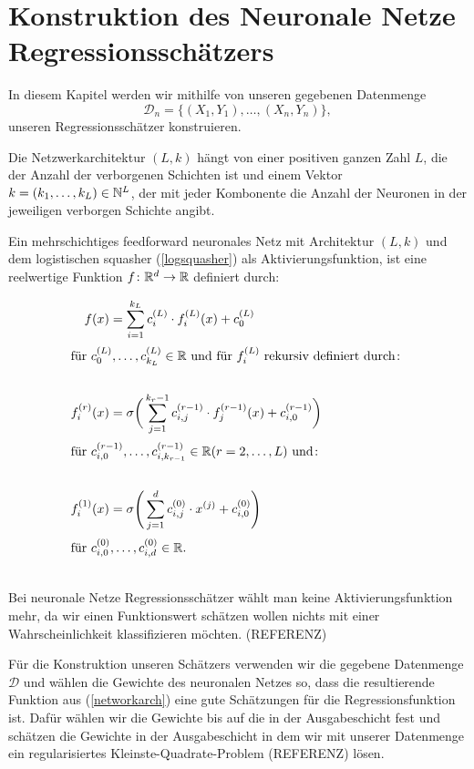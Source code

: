 \chapter{Konstruktion des Neuronale Netze Regressionsschätzers}
\label{chap:2}

In diesem Kapitel werden wir mithilfe von unseren gegebenen Datenmenge 
$$ \mathcal{D}_n = \{(X_1, Y_1),\dots,(X_n, Y_n)\},$$
unseren Regressionsschätzer konstruieren. 

Die Netzwerkarchitektur $(L, k)$ hängt von einer positiven ganzen Zahl $L$, die der Anzahl der verborgenen Schichten ist und einem Vektor $k = (k_1,\dots,k_L) \in \mathbb{N}^L$, der mit jeder Kombonente die Anzahl der Neuronen in der jeweiligen verborgen Schichte angibt. 

Ein mehrschichtiges feedforward neuronales Netz mit Architektur $(L, k)$ und dem logistischen squasher (\ref{logsquasher}) als Aktivierungsfunktion, ist eine reelwertige Funktion $f\colon \mathbb{R}^d \to \mathbb{R}$ definiert durch$\colon$

\begin{align}
\label{networkarch}
f(x) & = \sum_{i = 1}^{k_L} c_i^{(L)} \cdot f_i^{(L)}(x) + c_0^{(L)} \nonumber \\
\intertext{für $c_0^{(L)},\dots,c_{k_L}^{(L)} \in \mathbb{R}$ und für $f_i^{(L)}$ rekursiv definiert durch$\colon$} \nonumber \\
f_i^{(r)}(x) & = \sigma \bigg(\sum_{j = 1}^{k_r - 1} c_{i,j}^{(r - 1)} \cdot f_j^{(r - 1)}(x) + c_{i,0}^{(r - 1)} \bigg) \nonumber \\
\intertext{für $c_{i,0}^{(r - 1)},\dots,c_{i,k_{r - 1}}^{(r - 1)} \in \mathbb{R} (r = 2,\dots, L)$ und$\colon$} \\
f_i^{(1)}(x) & = \sigma \Bigg(\sum_{j = 1}^{d} c_{i,j}^{(0)} \cdot x^{(j)} + c_{i,0}^{(0)} \Bigg) \nonumber \\
\intertext{für $c_{i,0}^{(0)},\dots,c_{i,d}^{(0)} \in \mathbb{R}$.} \nonumber
\end{align} 
Bei neuronale Netze Regressionsschätzer wählt man keine Aktivierungsfunktion mehr, da wir einen Funktionswert schätzen wollen nichts mit einer Wahrscheinlichkeit klassifizieren möchten. (REFERENZ)

Für die Konstruktion unseren Schätzers verwenden wir die gegebene Datenmenge $\mathcal{D}$ und wählen die Gewichte des neuronalen Netzes so, dass die resultierende Funktion aus (\ref{networkarch}) eine gute Schätzungen für die Regressionsfunktion ist. Dafür wählen wir die Gewichte bis auf die in der Ausgabeschicht fest und schätzen die Gewichte in der Ausgabeschicht in dem wir mit unserer Datenmenge ein regularisiertes Kleinste-Quadrate-Problem (REFERENZ) lösen.

